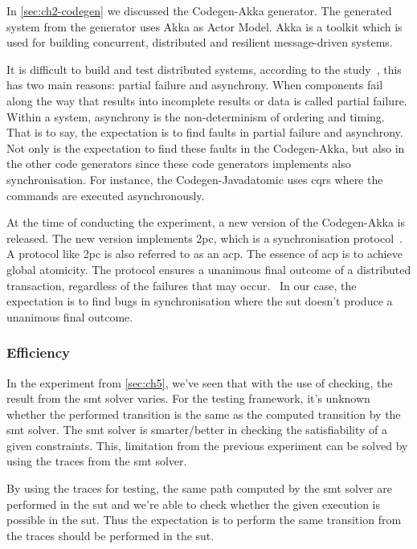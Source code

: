In \autoref{sec:ch2-codegen} we discussed the Codegen-Akka generator. The
generated system from the generator uses Akka as Actor Model. Akka is a toolkit
which is used for building concurrent, distributed and resilient
message-driven systems.~\cite[p.~4]{roestenburg2016akka}

It is difficult to build and test distributed systems, according to the
study~\cite[p.~1]{mccaffrey2016verification}, this has two main reasons: partial
failure and asynchrony. When components fail along the way that results into
incomplete results or data is called partial failure. Within a system,
asynchrony is the non-determinism of ordering and timing. That is to say, the
expectation is to find faults in partial failure and asynchrony. Not only is the
expectation to find these faults in the Codegen-Akka, but also in the other code
generators since these code generators implements also synchronisation. For
instance, the Codegen-Javadatomic uses \gls{cqrs} where the commands are
executed asynchronously.

At the time of conducting the experiment, a new version of the Codegen-Akka is
released. The new version implements \gls{2pc}, which is a synchronisation
protocol~\cite[p.~3204]{al2009two}. A protocol like \gls{2pc} is also referred
to as an \gls{acp}. The essence of \gls{acp} is to achieve global atomicity. The
protocol ensures a unanimous final outcome of a distributed transaction,
regardless of the failures that may occur.~\cite[p.~3204]{al2009two} In our
case, the expectation is to find bugs in synchronisation where the \gls{sut}
doesn't produce a unanimous final outcome.

\subsubsection{Efficiency}
In the experiment from \autoref{sec:ch5}, we've seen that with the use of
checking, the result from the \gls{smt} solver varies. For the testing
framework, it's unknown whether the performed transition is the same as the
computed transition by the \gls{smt} solver. The \gls{smt} solver is
smarter/better in checking the satisfiability of a given constraints. This,
limitation from the previous experiment can be solved by using the traces from
the \gls{smt} solver.

By using the traces for testing, the same path computed by the \gls{smt} solver
are performed in the \gls{sut} and we're able to check whether the given
execution is possible in the \gls{sut}. Thus the expectation is to perform the
same transition from the traces should be performed in the \gls{sut}.


